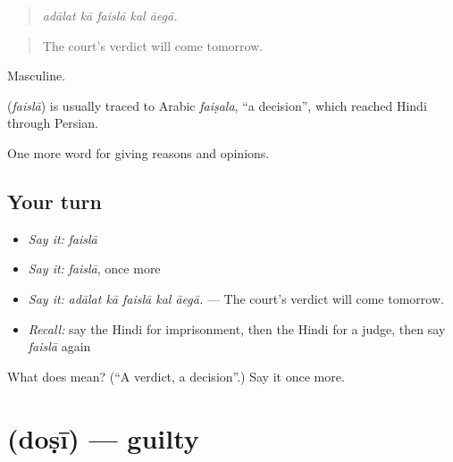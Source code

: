 \begin{quote}
    
\end{quote}

\begin{quote}
\emph{adālat kā faislā kal āegā.}
\end{quote}

\begin{quote}
The court's verdict will come tomorrow.
\end{quote}

Masculine.

\begin{cousinweb}
\textbf{} (\emph{faislā}) is usually traced to Arabic \emph{faiṣala}, \textquotedblleft{}a decision\textquotedblright{}, which reached Hindi through Persian.
\end{cousinweb}

\begin{grammarlens}[title={What you've built}]
One more word for giving reasons and opinions.
\end{grammarlens}

\subsection*{Your turn}
\begin{itemize}
\raggedright
  \item \emph{Say it:} \emph{faislā}
  \item \emph{Say it:} \emph{faislā}, once more
  \item \emph{Say it:} \emph{adālat kā faislā kal āegā.} — The court's verdict will come tomorrow.
  \item \emph{Recall:} say the Hindi for imprisonment, then the Hindi for a judge, then say \emph{faislā} again
\end{itemize}

\begin{tcolorbox}[breakable,colback=teal!4,colframe=teal!35!black,title={Before you move on}]
What does  mean? (\textquotedblleft{}A verdict, a decision\textquotedblright{}.) Say it once more.
\end{tcolorbox}
\section[\texorpdfstring{\hi{दोषी} (doṣī)}{दोषी (doṣī)}]{ (doṣī) — guilty}

\label{lesson:HI-C352-dosi}



